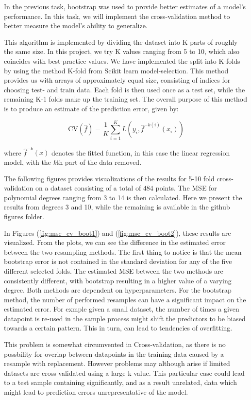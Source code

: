 \documentclass[11pt, a4paper]{article}
\begin{document}
In the previous task, bootstrap was used to provide better estimates of a model's performance.  In this task, we will implement the cross-validation method to better measure the model's ability to generalize.

This algorithm is implemented by dividing the dataset into K parts of roughly the same size. In this project, we try K values ranging from 5 to 10, which also coincides with best-practice values. \cite{Hastie2009}  We have implemented the split into K-folds by using the method K-fold from Scikit learn model-selection. \cite{scikit-learn} This method provides us with arrays of approximately equal size, consisting of indices for choosing test- and train data.  Each fold is then used once as a test set, while the remaining K-1 folds make up the training set. The overall purpose of this method is to produce an estimate of the prediction error, given by:

\[
  \text{CV}(\hat{f}) = \frac{1}{K}
  \sum_{i=1}^{K}L(y_i,\hat{f}^{-k(i)}(x_i))
\]

where $\hat{f}^{-k}(x)$ denotes the fitted function, in this case the linear regression model, with the \emph{k}th part of the data removed.\cite{Hastie2009}

The following figures provides visualizations of the results for 5-10 fold cross-validation on a dataset consisting of a total of $484$ points. The MSE for polynomial degrees ranging from 3 to 14 is then calculated. Here we present the results from degrees 3 and 10, while the remaining is available in the github figures folder.

In Figures (\ref{fig:mse_cv_boot1}) and (\ref{fig:mse_cv_boot2}), these results are visualized. From the plots, we can see the difference in the estimated error between the two resampling methods. The first thing to notice is that the mean bootstrap error is not contained in the standard deviation for any of the five different selected folds. The estimated MSE between the two methods are consistently different, with bootstrap resulting in a higher value of a varying degree.  Both methods are dependent on hyperparameters. For the bootstrap method, the number of performed resamples can have a significant impact on the estimated error. For exmple given a small dataset, the number of times a given datapoint is re-used in the sample process might shift the predictors to be biased towards a certain pattern. This in turn, can lead to tendencies of overfitting.

This problem is somewhat circumvented in Cross-validation, as there is no possbility for overlap between datapoints in the training data caused by a resample with replacement. However problems may although arise if limited datasets are cross-validated using a large k-value. This particular case could lead to a test sample containing significantly, and as a result unrelated, data which might lead to prediction errors unrepresentative of the model.
\end{document}
